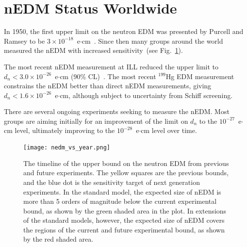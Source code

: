 \section{nEDM Status Worldwide\label{sec:nedmWW}}
In 1950, the first upper limit on the neutron EDM was presented by
Purcell and Ramsey to be
$3 \times 10^{-18}$~e$\cdot$cm~\cite{PhysRev.78.807}. Since then many
groups around the world measured the nEDM with increased
sensitivity~(see Fig.~\ref{fig:nEDMhistory}).

The most recent nEDM measurement at ILL reduced the upper limit to
$d_n< 3.0 \times 10^{-26}$~e$\cdot$cm (90\% CL)~\cite{Baker2006,
  Pendlebury2015}. The most recent $^{199}$Hg EDM
measurement~\cite{graner2016reduced} constrains the nEDM better than
direct nEDM measurements, giving
$d_n < 1.6 \times 10^{-26}$~e$\cdot$cm, although subject to
uncertainty from Schiff screening.

There are several ongoing experiments seeking to measure the
nEDM. Most groups are aiming initially for an improvement of the limit
on $d_n$ to the $10^{-27}$~e$\cdot$cm level, ultimately improving to
the $10^{-28}$~e$\cdot$cm level over time.


\begin{figure}[h!]
  \centering
  \texttt{[image: nedm\_vs\_year.png]}
  \caption[History of nEDM measurement]{The timeline of the upper
    bound on the neutron EDM from previous and future experiments. The
    yellow squares are the previous bounds, and the blue dot is the
    sensitivity target of next generation experiments.  In the
    standard model, the expected size of nEDM is more than 5 orders of
    magnitude below the current experimental bound, as shown by the
    green shaded area in the plot. In extensions of the standard
    models, however, the expected size of nEDM covers the regions of
    the current and future experimental bound, as shown by the red
    shaded area.~\cite{yoon2018neutron} }
  \label{fig:nEDMhistory}
\end{figure}

